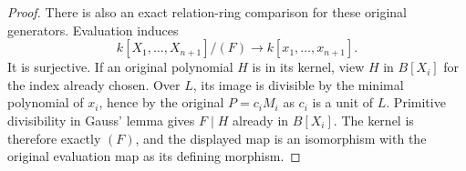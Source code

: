 \begin{proof}
There is also an exact relation-ring comparison for
these original generators. Evaluation induces
$$
k[X_1,\ldots,X_{n+1}]/(F)
\longrightarrow k[x_1,\ldots,x_{n+1}].
$$
It is surjective. If an original polynomial $H$ is in
its kernel, view $H$ in $B[X_i]$ for the index already
chosen. Over $L$, its image is divisible by the
minimal polynomial of $x_i$, hence by the original
$P=c_iM_i$ as $c_i$ is a unit of $L$. Primitive
divisibility in Gauss' lemma gives $F\mid H$ already
in $B[X_i]$. The kernel is therefore exactly $(F)$,
and the displayed map is an isomorphism with the
original evaluation map as its defining morphism.
\end{proof}